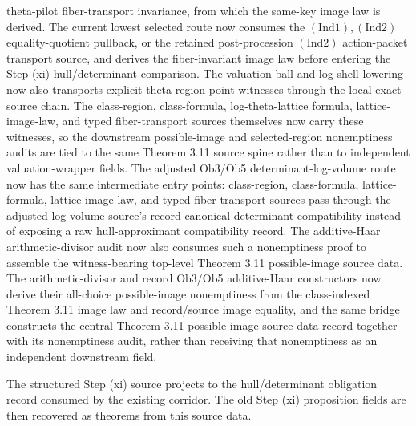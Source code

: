 \begin{proposition}
  theta-pilot fiber-transport invariance, from which the same-key image law is
  derived.  The current lowest selected route now consumes the
  \((\mathrm{Ind}1),(\mathrm{Ind}2)\) equality-quotient pullback, or the
  retained post-procession \((\mathrm{Ind}2)\) action-packet transport source,
  and derives the fiber-invariant image law before entering the Step (xi)
  hull/determinant comparison.  The valuation-ball and log-shell lowering now
  also transports explicit theta-region point witnesses through the local
  exact-source chain.  The class-region, class-formula, log-theta-lattice
  formula, lattice-image-law, and typed fiber-transport sources themselves
  now carry these witnesses, so the downstream possible-image and
  selected-region nonemptiness audits are tied to the same Theorem 3.11
  source spine rather than to independent valuation-wrapper fields.  The
  adjusted Ob3/Ob5 determinant-log-volume route now has the same intermediate
  entry points: class-region, class-formula, lattice-formula,
  lattice-image-law, and typed fiber-transport sources pass through the
  adjusted log-volume source's record-canonical determinant compatibility
  instead of exposing a raw hull-approximant compatibility record.  The
  additive-Haar arithmetic-divisor audit now also consumes such a nonemptiness
  proof to assemble the witness-bearing top-level Theorem 3.11 possible-image
  source data.  The arithmetic-divisor and record Ob3/Ob5 additive-Haar
  constructors now derive their all-choice possible-image nonemptiness from
  the class-indexed Theorem 3.11 image law and record/source image equality,
  and the same bridge constructs the central Theorem 3.11 possible-image
  source-data record together with its nonemptiness audit, rather than
  receiving that nonemptiness as an independent downstream field.
\end{proposition}

\begin{proposition}
  \label{prop:step-xi-source-assembles-obligations}
  \leanok
  The structured Step (xi) source projects to the hull/determinant obligation
  record consumed by the existing corridor.  The old Step (xi) proposition
  fields are then recovered as theorems from this source data.
\end{proposition}

